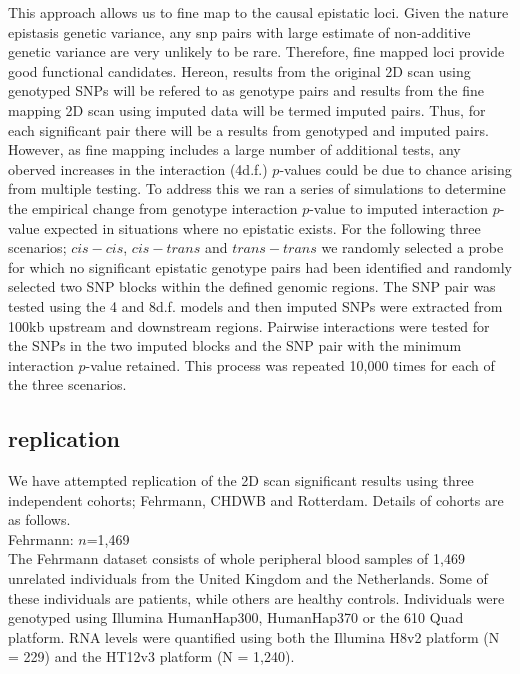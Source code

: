 \documentclass[paper=a4, fontsize=11pt]{scrartcl}	%
\numberwithin{equation}{section}									%
\numberwithin{figure}{section}										%
\numberwithin{table}{section}										%
\begin{document}
This approach allows us to fine map to the causal epistatic loci. Given the nature epistasis genetic variance, any snp pairs with large estimate of non-additive genetic variance are very unlikely to be rare. Therefore, fine mapped loci provide good functional candidates. Hereon, results from the original 2D scan using genotyped SNPs will be refered to as genotype pairs and results from the fine mapping 2D scan using imputed data will be termed imputed pairs. Thus, for each significant pair there will be a results from genotyped and imputed pairs. However, as fine mapping includes a large number of additional tests, any oberved increases in the interaction (4d.f.) $p$-values could be due to chance arising from multiple testing. To address this we ran a series of simulations to determine the empirical change from genotype interaction $p$-value to imputed interaction $p$-value expected in situations where no epistatic exists. For the following three scenarios; $cis-cis$, $cis-trans$ and $trans-trans$ we randomly selected a probe for which no significant epistatic genotype pairs had been identified and randomly selected two SNP blocks within the defined genomic regions. The SNP pair was tested using the 4 and 8d.f. models and then imputed SNPs were extracted from 100kb upstream and downstream regions. Pairwise interactions were tested for the SNPs in the two imputed blocks and the SNP pair with the minimum interaction $p$-value retained. This process was repeated 10,000 times for each of the three scenarios.   

     


\subsection{replication}  

We have attempted replication of the 2D scan significant results using three independent cohorts; Fehrmann, CHDWB and Rotterdam. Details of cohorts are as follows. \\[0.1cm]  

Fehrmann: $n$=1,469 \\[0.1cm]
The Fehrmann dataset consists of whole peripheral blood samples of 1,469 unrelated individuals from the United Kingdom and the Netherlands. Some of these individuals are patients, while others are healthy controls. Individuals were genotyped using Illumina HumanHap300, HumanHap370 or the 610 Quad platform. RNA levels were quantified using both the Illumina H8v2 platform (N = 229) and the HT12v3 platform (N = 1,240). \\[0.1cm]
\end{document}
